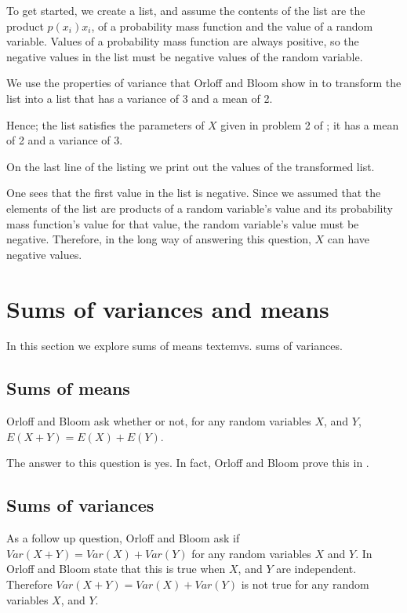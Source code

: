 \documentclass[a4paper,11pt]{article}
\begin{document}
To get started, we create a list, and assume the contents of the list are
the product $p \left(x_{i} \right) x_{i}$, of a probability mass function and
the value of a random variable.  Values of a probability mass function are
always positive, so the negative values in the list must be negative values
of the random variable.

We use the properties of variance that Orloff and Bloom show in \cite{reading5a}
to transform the list into a list that has a variance of 3 and a mean of 2.

Hence; the list satisfies the parameters of $X$ given in problem 2 of
\cite{reading5aQuestions}; it has a mean of 2 and a variance of 3.

On the last line of the listing we print out the values of the transformed list.

One sees that the first value in the list is negative.  Since we assumed that
the elements of the list are products of a random variable's value and its
probability mass function's value for that value, the random variable's value
must be negative.  Therefore, in the long way of answering this question, $X$
can have negative values.

\section{Sums of variances and means}
In this section we explore sums of means textem{vs}. sums of variances.

\subsection{Sums of means}
Orloff and Bloom ask whether or not, for any random variables $X$, and $Y$,
$E \left( X + Y \right) = E \left(X \right) + E\left( Y\right)$.

The answer to this question is yes.  In fact, Orloff and Bloom prove this in
\cite{reading4b}.

\subsection{Sums of variances}
As a follow up question, Orloff and Bloom ask if $Var \left( X + Y \right) =
Var \left(X \right) + Var \left( Y \right)$ for any random variables $X$ and
$Y$.  In \cite{reading5a} Orloff and Bloom state that this is true when $X$,
and $Y$ are independent.  Therefore $Var \left( X + Y \right) =
Var \left(X \right) + Var \left( Y \right)$ is not true for any random variables
$X$, and $Y$.
\end{document}
